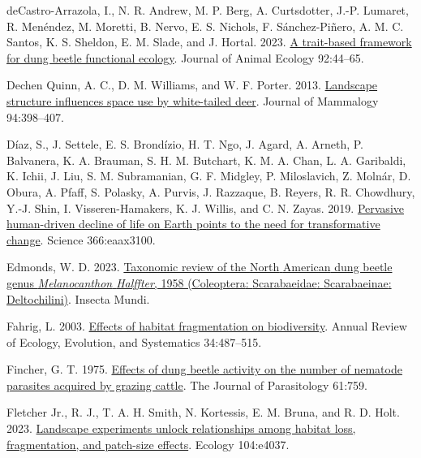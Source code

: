 \documentclass[
  man, donotrepeattitle]{apa6}
\newlength{\cslhangindent}
\newenvironment{CSLReferences}[2] %
 {\begin{list}{}{%
  \setlength{\itemindent}{0pt}
  \setlength{\leftmargin}{0pt}
  \setlength{\parsep}{0pt}
  \ifodd #1
   \setlength{\leftmargin}{\cslhangindent}
   \setlength{\itemindent}{-1\cslhangindent}
  \fi
  \setlength{\itemsep}{#2\baselineskip}}}
 {\end{list}}
\begin{document}
\begin{CSLReferences}{1}{0}
deCastro-Arrazola, I., N. R. Andrew, M. P. Berg, A. Curtsdotter, J.-P. Lumaret, R. Menéndez, M. Moretti, B. Nervo, E. S. Nichols, F. Sánchez-Piñero, A. M. C. Santos, K. S. Sheldon, E. M. Slade, and J. Hortal. 2023. \href{https://doi.org/10.1111/1365-2656.13829}{A trait-based framework for dung beetle functional ecology}. Journal of Animal Ecology 92:44--65.

Dechen Quinn, A. C., D. M. Williams, and W. F. Porter. 2013. \href{https://doi.org/10.1644/11-MAMM-A-221.1}{Landscape structure influences space use by white-tailed deer}. Journal of Mammalogy 94:398--407.

Díaz, S., J. Settele, E. S. Brondízio, H. T. Ngo, J. Agard, A. Arneth, P. Balvanera, K. A. Brauman, S. H. M. Butchart, K. M. A. Chan, L. A. Garibaldi, K. Ichii, J. Liu, S. M. Subramanian, G. F. Midgley, P. Miloslavich, Z. Molnár, D. Obura, A. Pfaff, S. Polasky, A. Purvis, J. Razzaque, B. Reyers, R. R. Chowdhury, Y.-J. Shin, I. Visseren-Hamakers, K. J. Willis, and C. N. Zayas. 2019. \href{https://doi.org/10.1126/science.aax3100}{Pervasive human-driven decline of life on {Earth} points to the need for transformative change}. Science 366:eaax3100.

Edmonds, W. D. 2023. \href{https://journals.flvc.org/mundi/article/view/134908}{Taxonomic review of the {North} {American} dung beetle genus \emph{{Melanocanthon} {Halffter}}, 1958 ({Coleoptera}: {Scarabaeidae}: {Scarabaeinae}: {Deltochilini})}. Insecta Mundi.

Fahrig, L. 2003. \href{https://doi.org/10.1146/annurev.ecolsys.34.011802.132419}{Effects of habitat fragmentation on biodiversity}. Annual Review of Ecology, Evolution, and Systematics 34:487--515.

Fincher, G. T. 1975. \href{https://doi.org/10.2307/3279480}{Effects of dung beetle activity on the number of nematode parasites acquired by grazing cattle}. The Journal of Parasitology 61:759.

Fletcher Jr., R. J., T. A. H. Smith, N. Kortessis, E. M. Bruna, and R. D. Holt. 2023. \href{https://doi.org/10.1002/ecy.4037}{Landscape experiments unlock relationships among habitat loss, fragmentation, and patch-size effects}. Ecology 104:e4037.


\end{CSLReferences}
\end{document}
